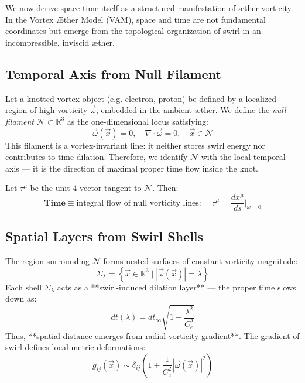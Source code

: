 \documentclass[12pt]{article}
\begin{document}
    We now derive space-time itself as a structured manifestation of æther vorticity. In the Vortex \AE ther Model (VAM), space and time are not fundamental coordinates but emerge from the topological organization of swirl in an incompressible, inviscid æther.

    \subsection{Temporal Axis from Null Filament}
    \label{subsec:null_filament_time}

    Let a knotted vortex object (e.g. electron, proton) be defined by a localized region of high vorticity \( \vec{\omega} \), embedded in the ambient æther. We define the \textit{null filament} \( \mathcal{N} \subset \mathbb{R}^3 \) as the one-dimensional locus satisfying:
    \begin{equation}
        \vec{\omega}(\vec{x}) = 0, \quad \nabla \cdot \vec{\omega} = 0, \quad \vec{x} \in \mathcal{N}
    \end{equation}
    This filament is a vortex-invariant line: it neither stores swirl energy nor contributes to time dilation. Therefore, we identify \( \mathcal{N} \) with the local temporal axis — it is the direction of maximal proper time flow inside the knot.

    Let \( \tau^\mu \) be the unit 4-vector tangent to \( \mathcal{N} \). Then:
    \begin{equation}
        \boxed{
            \textbf{Time} \equiv \text{integral flow of null vorticity lines: }
            \quad \tau^\mu = \frac{dx^\mu}{ds} \Big|_{\omega = 0}
        }
    \end{equation}

    \subsection{Spatial Layers from Swirl Shells}
    \label{subsec:swirl_shells_space}

    The region surrounding \( \mathcal{N} \) forms nested surfaces of constant vorticity magnitude:
    \[
        \Sigma_\lambda = \left\{ \vec{x} \in \mathbb{R}^3 \mid |\vec{\omega}(\vec{x})| = \lambda \right\}
    \]
    Each shell \( \Sigma_\lambda \) acts as a **swirl-induced dilation layer** — the proper time slows down as:
    \[
        dt(\lambda) = dt_\infty \sqrt{1 - \frac{\lambda^2}{C_e^2}}
    \]
    Thus, **spatial distance emerges from radial vorticity gradient**. The gradient of swirl defines local metric deformations:
    \begin{equation}
        g_{ij}(\vec{x}) \sim \delta_{ij} \left( 1 + \frac{1}{C_e^2} |\vec{\omega}(\vec{x})|^2 \right)
    \end{equation}
\end{document}
